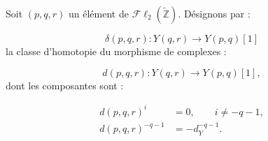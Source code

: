 Soit $(p,q,r)$ un élément de
$\mathcal{F}\ell_2(\widetilde{\mathbb Z})$. Désignons par :

\begin{equation}
\delta(p,q,r)\colon Y(q,r)\longrightarrow Y(p,q)[1]
\tag{4.1.2.6}
\end{equation}
la classe d'homotopie du morphisme de complexes :

\begin{equation}
d(p,q,r)\colon Y(q,r)\longrightarrow Y(p,q)[1],
\tag{4.1.2.7}
\end{equation}
dont les composantes sont :

\begin{equation}
\begin{aligned}
d(p,q,r)^i&=0,\qquad i\neq-q-1,\\
d(p,q,r)^{-q-1}&=-d_Y^{-q-1}.
\end{aligned}
\tag{4.1.2.8}
\end{equation}
\endgroup
